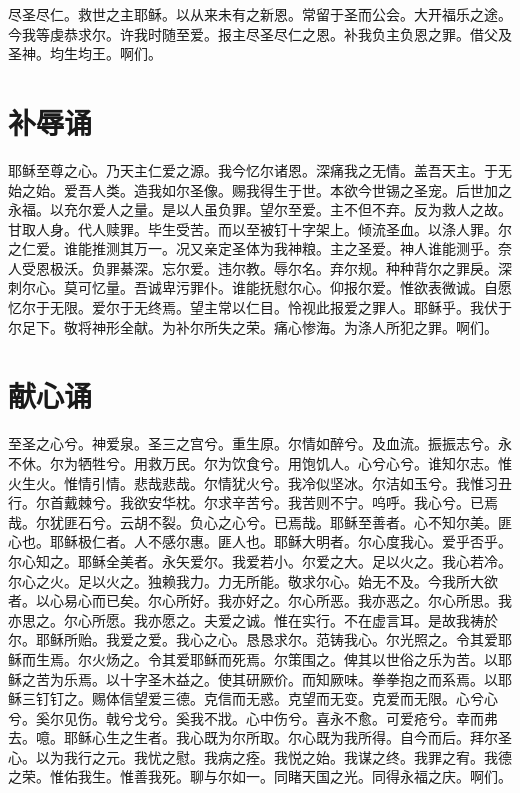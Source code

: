 \documentclass[UTF8,17pt]{ctexart}
\begin{document}
尽圣尽仁。救世之主耶稣。以从来未有之新恩。常留于圣⽽公会。⼤开福乐之途。今我等虔恭求尔。许我时随⾄爱。报主尽圣尽仁之恩。补我负主负恩之罪。借⽗及圣神。均⽣均王。啊们。

\section{补辱诵}

耶稣⾄尊之⼼。乃天主仁爱之源。我今忆尔诸恩。深痛我之⽆情。盖吾天主。于⽆始之始。爱吾⼈类。造我如尔圣像。赐我得⽣于世。本欲今世锡之圣宠。后世加之永福。以充尔爱⼈之量。是以⼈虽负罪。望尔⾄爱。主不但不弃。反为救⼈之故。⽢取⼈⾝。代⼈赎罪。毕⽣受苦。⽽以⾄被钉⼗字架上。倾流圣⾎。以涤⼈罪。尔之仁爱。谁能推测其万⼀。况又亲定圣体为我神粮。主之圣爱。神⼈谁能测乎。奈⼈受恩极沃。负罪綦深。忘尔爱。违尔教。辱尔名。弃尔规。种种背尔之罪戾。深刺尔⼼。莫可忆量。吾诚卑污罪仆。谁能抚慰尔⼼。仰报尔爱。惟欲表微诚。⾃愿忆尔于⽆限。爱尔于⽆终焉。望主常以仁⽬。怜视此报爱之罪⼈。耶稣乎。我伏于尔⾜下。敬将神形全献。为补尔所失之荣。痛⼼惨海。为涤⼈所犯之罪。啊们。

\section{献⼼诵}

⾄圣之⼼兮。神爱泉。圣三之宫兮。重⽣原。尔情如醉兮。及⾎流。振振志兮。永不休。尔为牺牲兮。⽤救万民。尔为饮⾷兮。⽤饱饥⼈。⼼兮⼼兮。谁知尔志。惟⽕⽣⽕。惟情引情。悲哉悲哉。尔情犹⽕兮。我冷似坚冰。尔洁如⽟兮。我惟习丑⾏。尔⾸戴棘兮。我欲安华枕。尔求⾟苦兮。我苦则不宁。呜呼。我⼼兮。已焉哉。尔犹匪⽯兮。云胡不裂。负⼼之⼼兮。已焉哉。耶稣⾄善者。⼼不知尔美。匪⼼也。耶稣极仁者。⼈不感尔惠。匪⼈也。耶稣⼤明者。尔⼼度我⼼。爱乎否乎。尔⼼知之。耶稣全美者。永⽮爱尔。我爱若⼩。尔爱之⼤。⾜以火之。我⼼若冷。尔⼼之⽕。⾜以⽕之。独赖我⼒。⼒⽆所能。敬求尔⼼。始⽆不及。今我所⼤欲者。以⼼易⼼⽽已矣。尔⼼所好。我亦好之。尔⼼所恶。我亦恶之。尔⼼所思。我亦思之。尔⼼所愿。我亦愿之。夫爱之诚。惟在实⾏。不在虚⾔⽿。是故我祷於尔。耶稣所贻。我爱之爱。我⼼之⼼。恳恳求尔。范铸我⼼。尔光照之。令其爱耶稣⽽⽣焉。尔⽕炀之。令其爱耶稣⽽死焉。尔策围之。俾其以世俗之乐为苦。以耶稣之苦为乐焉。以⼗字圣⽊益之。使其研厥价。⽽知厥味。拳拳抱之⽽系焉。以耶稣三钉钉之。赐体信望爱三德。克信⽽⽆惑。克望⽽⽆变。克爱⽽⽆限。⼼兮⼼兮。奚尔见伤。戟兮⼽兮。奚我不戕。⼼中伤兮。喜永不愈。可爱疮兮。幸⽽弗去。噫。耶稣⼼⽣之⽣者。我⼼既为尔所取。尔⼼既为我所得。⾃今⽽后。拜尔圣⼼。以为我⾏之元。我忧之慰。我病之痊。我悦之始。我谋之终。我罪之宥。我德之荣。惟佑我⽣。惟善我死。聊与尔如⼀。同睹天国之光。同得永福之庆。啊们。
\end{document}

